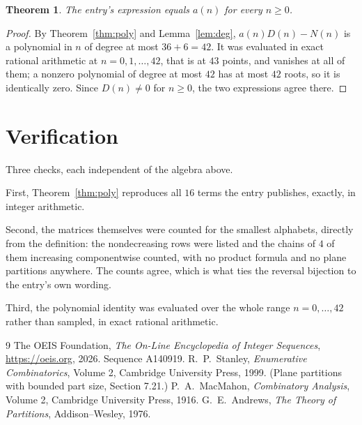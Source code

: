 \documentclass[11pt,a4paper]{article}
\theoremstyle{plain}
\newtheorem{theorem}{Theorem}
\theoremstyle{definition}
\begin{document}
\begin{theorem}
The entry's expression equals $a(n)$ for every $n\ge0$.
\end{theorem}

\begin{proof}
By Theorem~\ref{thm:poly} and Lemma~\ref{lem:deg}, $a(n)D(n)-N(n)$ is a polynomial in $n$
of degree at most $36+6=42$. It was evaluated in exact rational arithmetic at
$n=0,1,\dots,42$, that is at $43$ points, and vanishes at all of them; a nonzero polynomial
of degree at most $42$ has at most $42$ roots, so it is identically zero. Since $D(n)\neq0$
for $n\ge0$, the two expressions agree there.
\end{proof}

\section{Verification}

Three checks, each independent of the algebra above.

First, Theorem~\ref{thm:poly} reproduces all $16$ terms the entry publishes,
exactly, in integer arithmetic.

Second, the matrices themselves were counted for the smallest alphabets, directly from the
definition: the nondecreasing rows were listed and the chains of $4$ of them increasing
componentwise counted, with no product formula and no plane partitions anywhere. The counts
agree, which is what ties the reversal bijection to the entry's own wording.

Third, the polynomial identity was evaluated over the whole range $n=0,\dots,42$ rather than
sampled, in exact rational arithmetic.

\begin{thebibliography}{9}
 The OEIS Foundation, \emph{The On-Line Encyclopedia of Integer
Sequences}, \url{https://oeis.org}, 2026. Sequence A140919.
 R.~P.~Stanley, \emph{Enumerative Combinatorics}, Volume 2, Cambridge
University Press, 1999. (Plane partitions with bounded part size, Section 7.21.)
 P.~A.~MacMahon, \emph{Combinatory Analysis}, Volume 2, Cambridge
University Press, 1916.
 G.~E.~Andrews, \emph{The Theory of Partitions}, Addison--Wesley, 1976.
\end{thebibliography}
\end{document}
